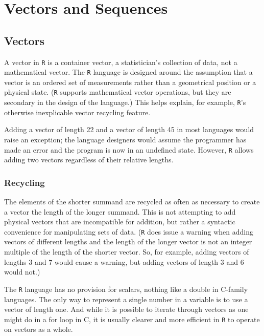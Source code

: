 \documentclass[a4paper,12pt]{article}
\begin{document}
\section{Vectors and Sequences}
\subsection{Vectors}




A vector in \texttt{R} is a container vector, a statistician's collection of data, not a mathematical vector. The \texttt{R} language is designed around the assumption that a vector is an ordered set of measurements rather than a geometrical position or a physical state. (\texttt{R} supports mathematical vector operations, but they are secondary in the design of the language.) This helps explain, for example, \texttt{R}'s otherwise inexplicable vector recycling feature.

Adding a vector of length 22 and a vector of length 45 in most languages would raise an exception; the language designers would assume the programmer has made an error and the program is now in an undefined state. However, \texttt{R} allows adding two vectors regardless of their relative lengths.

\subsubsection{Recycling}
 The elements of the shorter summand are recycled as often as necessary to create a vector the length of the longer summand. This is not attempting to add physical vectors that are incompatible for addition, but rather a syntactic convenience for manipulating sets of data. (\texttt{R} does issue a warning when adding vectors of different lengths and the length of the longer vector is not an integer multiple of the length of the shorter vector. So, for example, adding vectors of lengths 3 and 7 would cause a warning, but adding vectors of length 3 and 6 would not.)

The \texttt{R}  language has no provision for scalars, nothing like a double in C-family languages. The only way to represent a single number in a variable is to use a vector of length one. And while it is possible to iterate through vectors as one might do in a for loop in C, it is usually clearer and more efficient in \texttt{R} to operate on vectors as a whole.
\end{document}
